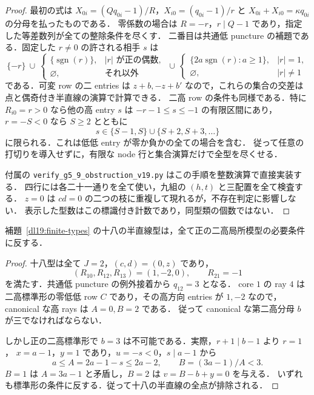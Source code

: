 \begin{proof}
最初の式は $X_{0i}=(Qq_{0i}-1)/R$，$X_{i0}=(q_{0i}-1)/r$ と
$X_{0i}+X_{i0}=\kappa q_{0i}$ の分母を払ったものである．
零係数の場合は $R=-r$，$r\mid Q-1$ であり，指定した等差数列が全ての整除条件を尽くす．
二番目は共通低 puncture の補題である．固定した $r\ne0$ の許される相手 $s$ は
\[
 \{-r\}\ \cup\
 \begin{cases}\{\operatorname{sgn}(r)\},&|r|\text{ が正の偶数},\\
 \varnothing,&\text{それ以外}\end{cases}
 \ \cup\
 \begin{cases}\{2a\operatorname{sgn}(r):a\ge1\},&|r|=1,\\
 \varnothing,&|r|\ne1\end{cases}
\]
である．可変 row の二 entries は $z+b,-z+b'$ なので，これらの集合の交差は
点と偶奇付き半直線の演算で計算できる．
二高 row の条件も同様である．特に $R_{i0}=r>0$ なら他の高 entry $s$ は
$-r-1\le s\le-1$ の有限区間にあり，$r=-S<0$ なら $S\ge2$ とともに
\[
 s\in\{S-1,S\}\cup\{S+2,S+3,\ldots\}
\]
に限られる．これは低低 entry が零か負かの全ての場合を含む．
従って任意の打切りを導入せずに，有限な node 行と集合演算だけで全型を尽くせる．

付属の \texttt{verify\_g5\_9\_obstruction\_v19.py} はこの手順を整数演算で直接実装する．
四行には各二十一通りを全て使い，九組の $(h,t)$ と三配置を全て検査する．
$z=0$ は $cd=0$ の二つの枝に重複して現れるが，不存在判定に影響しない．
表示した型数はこの標識付き計数であり，同型類の個数ではない．
\end{proof}

\begin{lemma}[残る十八の半直線型は不可能]
\label{dl19:halflines}
補題~\ref{dl19:finite-types} の十八の半直線型は，全て正の二高局所模型の必要条件に反する．
\end{lemma}
\begin{proof}
十八型は全て $J=2$，$(c,d)=(0,z)$ であり，
\[
 (R_{10},R_{12},R_{13})=(1,-2,0),\qquad R_{21}=-1
\]
を満たす．共通低 puncture の例外接着から $q_{12}=3$ となる．
core $1$ の ray $4$ は二高標準形の零低低 row $C$ であり，その高方向 entries が
$1,-2$ なので，canonical な高 rays は $A=0,B=2$ である．
従って canonical な第二高分母 $b$ が三でなければならない．

しかし正の二高標準形で $b=3$ は不可能である．実際，$r+1\mid b-1$ より $r=1$，
$x=a-1$，$y=1$ であり，$u=-s<0$，$s\mid a-1$ から
\[
 a\le A=2a-1-s\le2a-2,\qquad B=(3a-1)/A<3.
\]
$B=1$ は $A=3a-1$ と矛盾し，$B=2$ は $v=B-b+y=0$ を与える．
いずれも標準形の条件に反する．従って十八の半直線の全点が排除される．
\end{proof}

